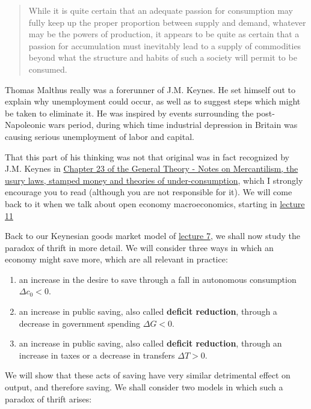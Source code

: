 \documentclass[]{book}
\theoremstyle{definition}
\theoremstyle{definition}
\theoremstyle{definition}
\theoremstyle{remark}
\begin{document}
\begin{quote}
While it is quite certain that an adequate passion for consumption may
fully keep up the proper proportion between supply and demand, whatever
may be the powers of production, it appears to be quite as certain that
a passion for accumulation must inevitably lead to a supply of
commodities beyond what the structure and habits of such a society will
permit to be consumed.
\end{quote}

Thomas Malthus really was a forerunner of J.M. Keynes. He set himself
out to explain why unemployment could occur, as well as to suggest steps
which might be taken to eliminate it. He was inspired by events
surrounding the post-Napoleonic wars period, during which time
industrial depression in Britain was causing serious unemployment of
labor and capital.

That this part of his thinking was not that original was in fact
recognized by J.M. Keynes in
\href{http://cas2.umkc.edu/economics/people/facultypages/kregel/courses/econ645/winter2011/generaltheory.pdf}{Chapter
23 of the General Theory - Notes on Mercantilism, the usury laws,
stamped money and theories of under-consumption}, which I strongly
encourage you to read (although you are not responsible for it). We will
come back to it when we talk about open economy macroeconomics, starting
in \protect\hyperlink{open}{lecture 11}

Back to our Keynesian goods market model of
\protect\hyperlink{cons-function}{lecture 7}, we shall now study the
paradox of thrift in more detail. We will consider three ways in which
an economy might save more, which are all relevant in practice:

\begin{enumerate}
\def\labelenumi{\arabic{enumi}.}
\item
  an increase in the desire to save through a fall in autonomous
  consumption \(\Delta c_0<0\).
\item
  an increase in public saving, also called \textbf{deficit reduction},
  through a decrease in government spending \(\Delta G<0\).
\item
  an increase in public saving, also called \textbf{deficit reduction},
  through an increase in taxes or a decrease in transfers
  \(\Delta T>0\).
\end{enumerate}

We will show that these acts of saving have very similar detrimental
effect on output, and therefore saving. We shall consider two models in
which such a paradox of thrift arises:
\end{document}
